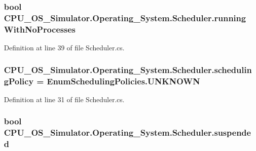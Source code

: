 \subsubsection[{running\+With\+No\+Processes}]{\setlength{\rightskip}{0pt plus 5cm}bool C\+P\+U\+\_\+\+O\+S\+\_\+\+Simulator.\+Operating\+\_\+\+System.\+Scheduler.\+running\+With\+No\+Processes\hspace{0.3cm}{\ttfamily [private]}}\label{class_c_p_u___o_s___simulator_1_1_operating___system_1_1_scheduler_af3276e8686d9efa7f8da6e48257922e3}


Definition at line 39 of file Scheduler.\+cs.

\hypertarget{class_c_p_u___o_s___simulator_1_1_operating___system_1_1_scheduler_a5a0194d8bb0127f6a8c010241d9ccb42}{}
\subsubsection[{scheduling\+Policy}]{ C\+P\+U\+\_\+\+O\+S\+\_\+\+Simulator.\+Operating\+\_\+\+System.\+Scheduler.\+scheduling\+Policy = {\bf Enum\+Scheduling\+Policies.\+U\+N\+K\+N\+O\+W\+N}\hspace{0.3cm}{\ttfamily [private]}}\label{class_c_p_u___o_s___simulator_1_1_operating___system_1_1_scheduler_a5a0194d8bb0127f6a8c010241d9ccb42}


Definition at line 31 of file Scheduler.\+cs.

\hypertarget{class_c_p_u___o_s___simulator_1_1_operating___system_1_1_scheduler_a844b64fe6c3917f055b61c4620995b74}{}
\subsubsection[{suspended}]{\setlength{\rightskip}{0pt plus 5cm}bool C\+P\+U\+\_\+\+O\+S\+\_\+\+Simulator.\+Operating\+\_\+\+System.\+Scheduler.\+suspended\hspace{0.3cm}{\ttfamily [private]}}\label{class_c_p_u___o_s___simulator_1_1_operating___system_1_1_scheduler_a844b64fe6c3917f055b61c4620995b74}


